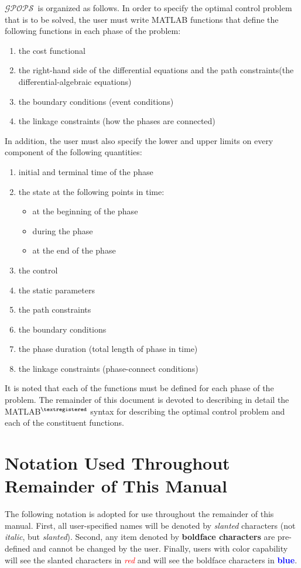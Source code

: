 \documentclass[10pt,final]{report}
\newcommand{\gpops}{$\mathcal{GPOPS}$~}
\newcommand{\bfblue}[1]{\textcolor{blue}{\bf #1}}
\newcommand{\slred}[1]{\textcolor{red}{\sl #1}}
\begin{document}
\gpops is organized as follows.  In order to specify the optimal control
problem that is to be solved, the user must write MATLAB functions that
define the following functions in each phase of the problem:
\begin{enumerate}[(1)]
  \item the cost functional
  \item the right-hand side of the differential equations and the path constraints(\ie the differential-algebraic equations)
  \item the boundary conditions (\ie event conditions)
  \item the linkage constraints (\ie how the phases are connected)
\end{enumerate}
In addition, the user must also specify the lower and upper limits on every component of the following quantities:
\begin{enumerate}[(1)]
  \item initial and terminal time of the phase
  \item the state at the following points in time:
    \begin{itemize}
    \item at the beginning of the phase
    \item during the phase
    \item at the end of the phase
    \end{itemize}
  \item the control
  \item the static parameters
  \item the path constraints
  \item the boundary conditions
  \item the phase duration (\ie total length of phase in time)
  \item the linkage constraints (\ie phase-connect conditions)
\end{enumerate}
It is noted that each of the functions must be defined for each phase
of the problem. The remainder of this document is devoted to describing in detail the
MATLAB${}^{\textregistered}$ syntax for describing the optimal control problem and each of the constituent functions.

\section{Notation Used Throughout Remainder of This Manual}

The following notation is adopted for use throughout the remainder of this
manual.  First, all user-specified names will be denoted by {\sl slanted}
characters (not {\em italic}, but {\sl slanted}).  Second, any item denoted by
{\bf boldface characters}  are pre-defined and cannot be changed by the user.
Finally, users with color capability will see the slanted characters in
\slred{red} and will see the boldface characters in \bfblue{blue}.
\end{document}
